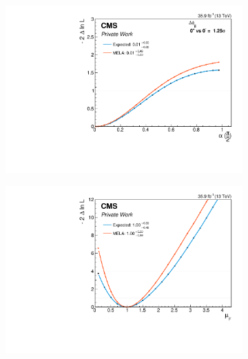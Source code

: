 \begin{figure}[h!]
    \centering
    \begin{subfigure}{.49\textwidth}
        \centering
        \includegraphics[width=\textwidth]{Figures/statana/Scan_JEC_jdphi/alpha_jdphi.pdf}
    \end{subfigure}
    \begin{subfigure}{.49\textwidth}
        \centering
        \includegraphics[width=\textwidth]{Figures/statana/Scan_JEC_jdphi/muF_jdphi.pdf}

\end{subfigure}
\end{figure}
